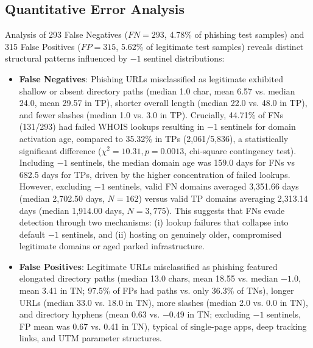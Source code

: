 \subsection{Quantitative Error Analysis}
Analysis of 293 False Negatives ($FN = 293$, 4.78\% of phishing test samples) and 315 False Positives ($FP = 315$, 5.62\% of legitimate test samples) reveals distinct structural patterns influenced by $-1$ sentinel distributions:
\begin{itemize}
    \item \textbf{False Negatives}: Phishing URLs misclassified as legitimate exhibited shallow or absent directory paths (median 1.0 char, mean 6.57 vs. median 24.0, mean 29.57 in TP), shorter overall length (median 22.0 vs. 48.0 in TP), and fewer slashes (median 1.0 vs. 3.0 in TP). Crucially, 44.71\% of FNs (131/293) had failed WHOIS lookups resulting in $-1$ sentinels for domain activation age, compared to 35.32\% in TPs (2,061/5,836), a statistically significant difference ($\chi^2 = 10.31, p = 0.0013$, chi-square contingency test). Including $-1$ sentinels, the median domain age was 159.0 days for FNs vs 682.5 days for TPs, driven by the higher concentration of failed lookups. However, excluding $-1$ sentinels, valid FN domains averaged 3,351.66 days (median 2,702.50 days, $N=162$) versus valid TP domains averaging 2,313.14 days (median 1,914.00 days, $N=3,775$). This suggests that FNs evade detection through two mechanisms: (i) lookup failures that collapse into default $-1$ sentinels, and (ii) hosting on genuinely older, compromised legitimate domains or aged parked infrastructure.
    \item \textbf{False Positives}: Legitimate URLs misclassified as phishing featured elongated directory paths (median 13.0 chars, mean 18.55 vs. median $-1.0$, mean 3.41 in TN; 97.5\% of FPs had paths vs. only 36.3\% of TNs), longer URLs (median 33.0 vs. 18.0 in TN), more slashes (median 2.0 vs. 0.0 in TN), and directory hyphens (mean 0.63 vs. $-0.49$ in TN; excluding $-1$ sentinels, FP mean was 0.67 vs. 0.41 in TN), typical of single-page apps, deep tracking links, and UTM parameter structures.
\end{itemize}

